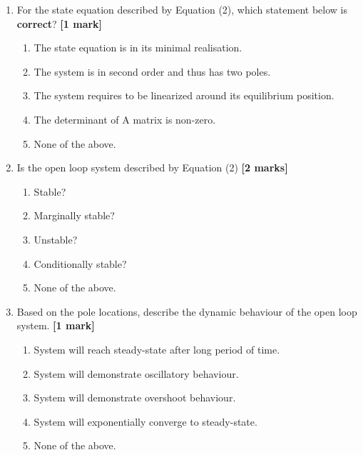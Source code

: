 \documentclass{article}
\begin{document}
\begin{enumerate}
\begin{enumerate}[label=\alph*.]
        \item None of the above.
    \end{enumerate}

    \item For the state equation described by Equation (2), which statement below is \textbf{correct}? \hfill \textbf{[1 mark]}
    \begin{enumerate}[label=\alph*.]
        \item The state equation is in its minimal realisation.
        \item The system is in second order and thus has two poles.
        \item The system requires to be linearized around its equilibrium position.
        \item The determinant of A matrix is non-zero.
        \item None of the above.
    \end{enumerate}

    \vspace{0.5cm}

    \item Is the open loop system described by Equation (2) \hfill \textbf{[2 marks]}
    \begin{enumerate}[label=\alph*.]
        \item Stable?
        \item Marginally stable?
        \item Unstable?
        \item Conditionally stable?
        \item None of the above.
    \end{enumerate}

    \item Based on the pole locations, describe the dynamic behaviour of the open loop system. \hfill \textbf{[1 mark]}
    \begin{enumerate}[label=\alph*.]
        \item System will reach steady-state after long period of time.
        \item System will demonstrate oscillatory behaviour.
        \item System will demonstrate overshoot behaviour.
        \item System will exponentially converge to steady-state.
        \item None of the above.
    \end{enumerate}


\end{enumerate}
\end{document}
